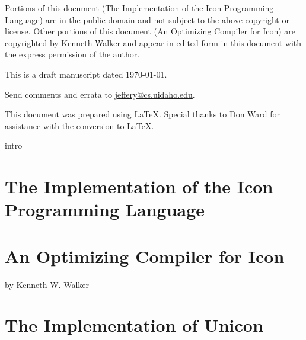 \documentclass[letterpaper,twoside,12pt]{book}
\begin{document}
Portions of this document ({\textquotedbl}The Implementation of the
Icon Programming Language{\textquotedbl}) are in the public domain and
not subject to the above copyright or license. Other portions of this
document ({\textquotedbl}An Optimizing Compiler for
Icon{\textquotedbl}) are copyrighted by Kenneth Walker and appear in
edited form in this document with the express permission of the
author.


\bigskip

\noindent This is a draft manuscript dated \today.

\noindent Send comments and errata to
\href{mailto:jeffery@cs.uidaho.edu}{jeffery@cs.uidaho.edu}.

\bigskip

\noindent This document was prepared using \LaTeX. Special thanks to Don Ward
for assistance with the conversion to \LaTeX.

\setcounter{tocdepth}{3}
\tableofcontents


\mainmatter
 {intro}

\part{The Implementation of the Icon Programming Language}














\part{An Optimizing Compiler for Icon}
\bigskip
by Kenneth W. Walker
















\part{The Implementation of Unicon}







\end{document}
